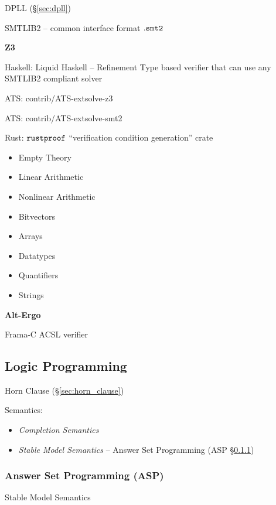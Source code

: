 DPLL (\S\ref{sec:dpll})

SMTLIB2 -- common interface format $\mathtt{.smt2}$


\textbf{Z3}

Haskell: Liquid Haskell -- Refinement Type based verifier that can use
any SMTLIB2 compliant solver

ATS: contrib/ATS-extsolve-z3

ATS: contrib/ATS-extsolve-smt2

Rust: $\mathtt{rustproof}$ ``verification condition generation'' crate

\begin{itemize}
  \item Empty Theory
  \item Linear Arithmetic
  \item Nonlinear Arithmetic
  \item Bitvectors
  \item Arrays
  \item Datatypes
  \item Quantifiers
  \item Strings
\end{itemize}


\textbf{Alt-Ergo}

Frama-C ACSL verifier



\subsection{Logic Programming}\label{sec:logic_programming}

Horn Clause (\S\ref{sec:horn_clause})

Semantics:
\begin{itemize}
  \item \emph{Completion Semantics}
  \item \emph{Stable Model Semantics} -- Answer Set Programming (ASP
    \S\ref{sec:asp})
\end{itemize}



\subsubsection{Answer Set Programming (ASP)}\label{sec:asp}

Stable Model Semantics

